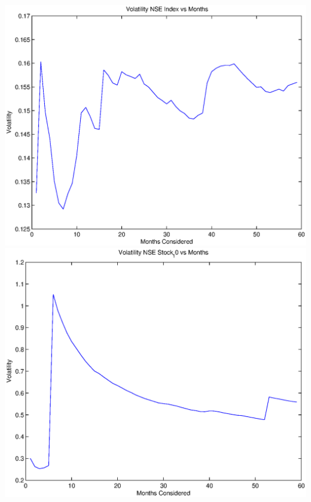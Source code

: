 \documentclass{article}
\begin{document}
\includegraphics[width=\textwidth]{Volatility_NSE_Index_vs_Months} \\

\includegraphics[width=\textwidth]{Volatility_NSE_Stock_10_vs_Months} \\
\end{document}
